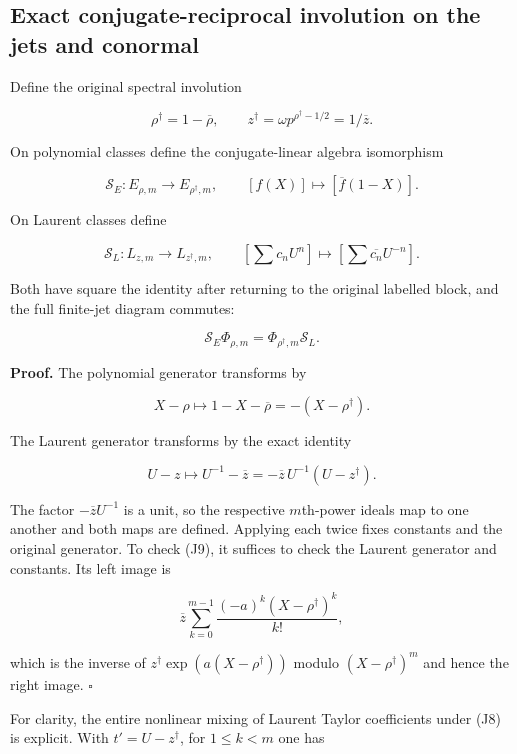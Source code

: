 \subsection{Exact conjugate-reciprocal involution on the jets and conormal}\label{exact-conjugate-reciprocal-involution-on-the-jets-and-conormal}

Define the original spectral involution

\[
\rho^\dagger=1-\overline\rho,
\qquad z^\dagger=\omega p^{\rho^\dagger-1/2}=1/\overline z.
\tag{J6}
\]

On polynomial classes define the conjugate-linear algebra isomorphism

\[
\mathcal S_E:E_{\rho,m}\longrightarrow E_{\rho^\dagger,m},
\qquad[f(X)]\longmapsto[\overline f(1-X)].
\tag{J7}
\]

On Laurent classes define

\[
\mathcal S_L:L_{z,m}\longrightarrow L_{z^\dagger,m},
\qquad\left[\sum c_nU^n\right]\longmapsto
\left[\sum\overline{c_n}U^{-n}\right].
\tag{J8}
\]

Both have square the identity after returning to the original labelled block, and the full finite-jet diagram commutes:

\[
\boxed{
\mathcal S_E\Phi_{\rho,m}
=\Phi_{\rho^\dagger,m}\mathcal S_L.
}\tag{J9}
\]

\textbf{Proof.} The polynomial generator transforms by

\[
X-\rho\longmapsto1-X-\overline\rho
=-(X-\rho^\dagger).
\]

The Laurent generator transforms by the exact identity

\[
U-z\longmapsto U^{-1}-\overline z
=-\overline z\,U^{-1}(U-z^\dagger).
\tag{J10}
\]

The factor \(-\overline z U^{-1}\) is a unit, so the respective \(m\)th-power ideals map to one another and both maps are defined. Applying each twice fixes constants and the original generator. To check (J9), it suffices to check the Laurent generator and constants. Its left image is

\[
\overline z\sum_{k=0}^{m-1}
\frac{(-a)^k(X-\rho^\dagger)^k}{k!},
\]

which is the inverse of \(z^\dagger  \exp(a(X-\rho ^\dagger ))\) modulo \((X-\rho ^\dagger )^m\) and hence the right image. \(\square\)

For clarity, the entire nonlinear mixing of Laurent Taylor coefficients under (J8) is explicit. With \(t'=U-z^\dagger\), for \(1\le k<m\) one has

